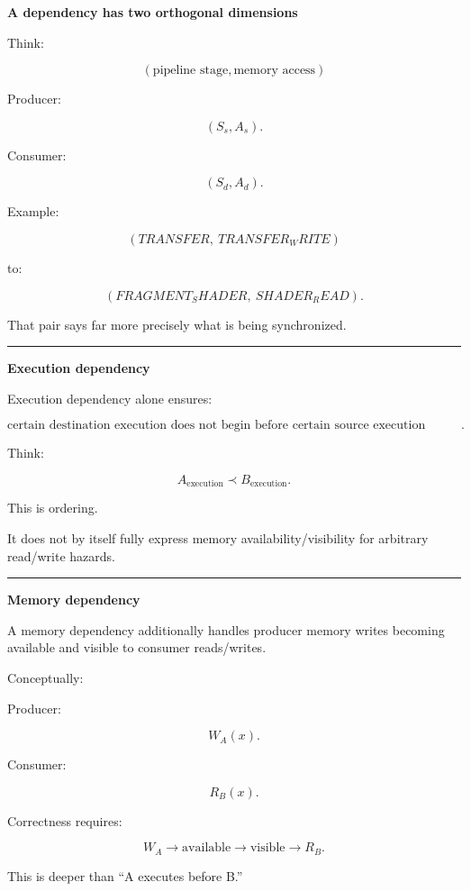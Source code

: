 \textbf{A dependency has two orthogonal dimensions}

Think:

\[
\boxed{
(\text{pipeline stage},\text{memory access})
}
\]

Producer:

\[
(S_s,A_s).
\]

Consumer:

\[
(S_d,A_d).
\]

Example:

\[
(TRANSFER,\ TRANSFER_WRITE)
\]

to:

\[
(FRAGMENT_SHADER,\ SHADER_READ).
\]

That pair says far more precisely what is being synchronized.

\begin{center}\rule{0.5\linewidth}{0.5pt}\end{center}

\textbf{Execution dependency}

Execution dependency alone ensures:

\[
\boxed{
\text{certain destination execution does not begin before certain source execution reaches the required point}.
}
\]

Think:

\[
A_{\text{execution}}
\prec
B_{\text{execution}}.
\]

This is ordering.

It does not by itself fully express memory availability/visibility for arbitrary read/write hazards.

\begin{center}\rule{0.5\linewidth}{0.5pt}\end{center}

\textbf{Memory dependency}

A memory dependency additionally handles producer memory writes becoming available and visible to consumer reads/writes.

Conceptually:

Producer:

\[
W_A(x).
\]

Consumer:

\[
R_B(x).
\]

Correctness requires:

\[
\boxed{
W_A
\rightarrow
\text{available}
\rightarrow
\text{visible}
\rightarrow
R_B.
}
\]

This is deeper than ``A executes before B.''

